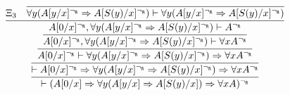 \begin{enumerate}
    $$
    \infer{
        \vdash (A[0/x] \Rightarrow \forall y(A[y/x] \Rightarrow A[S(y)/x]) \Rightarrow \forall x A)^{\neg_\R}
    }{
        \infer{
            \vdash A[0/x]^{\neg_\R} \Rightarrow \forall y(A[y/x]^{\neg_\R} \Rightarrow A[S(y)/x]^{\neg_\R}) \Rightarrow \forall x A^{\neg_\R}
        }{
            \infer{
                A[0/x]^{\neg_\R} \vdash \forall y(A[y/x]^{\neg_\R} \Rightarrow A[S(y)/x]^{\neg_\R}) \Rightarrow \forall x A^{\neg_\R}
            }{
                \infer{
                    A[0/x]^{\neg_\R}, \forall y(A[y/x]^{\neg_\R} \Rightarrow A[S(y)/x]^{\neg_\R}) \vdash \forall x A^{\neg_\R}
                }{
                    \infer{
                        A[0/x]^{\neg_\R}, \forall y(A[y/x]^{\neg_\R} \Rightarrow A[S(y)/x]^{\neg_\R}) \vdash A^{\neg_\R}
                    }{
                        \Xi_3
                        &
                        \infer{
                            \forall y(A[y/x]^{\neg_\R} \Rightarrow A[S(y)/x]^{\neg_\R}) \vdash \forall y(A[y/x]^{\neg_\R} \Rightarrow A[S(y)/x]^{\neg_\R})
                        }{
                        }
                    }
                }
            }
        }
    }
    $$
\end{enumerate}